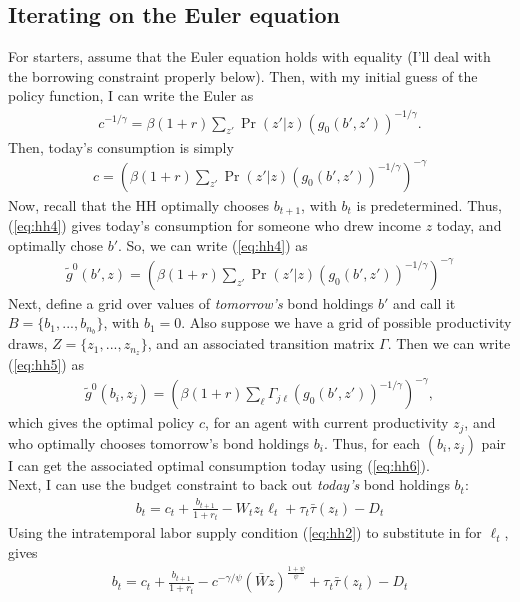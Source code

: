 \documentclass[12pt]{article}
\begin{document}
\subsection{Iterating on the Euler equation}
For starters, assume that the Euler equation holds with equality (I'll deal with the borrowing constraint properly below). Then, with my initial guess of the policy function, I can write the Euler as
\begin{align*}
c^{-1/\gamma} = \beta(1+r) \sum_{z'}\Pr(z'|z)(g_0(b',z'))^{-1/\gamma}.
\end{align*}
Then, today's consumption is simply
\begin{align}
c = \left( \beta(1+r) \sum_{z'}\Pr(z'|z)(g_0(b',z'))^{-1/\gamma}\right)^{-\gamma} \label{eq:hh4}
\end{align}
Now, recall that the HH optimally chooses $b_{t+1}$, with $b_t$ is predetermined. Thus, (\ref{eq:hh4}) gives today's consumption for someone who drew income $z$ today, and optimally chose $b'$. So, we can write (\ref{eq:hh4}) as
\begin{align}
\tilde g^0(b',z) = \left( \beta(1+r) \sum_{z'}\Pr(z'|z)(g_0(b',z'))^{-1/\gamma}\right)^{-\gamma} \label{eq:hh5}
\end{align}
Next, define a grid over values of \textit{tomorrow's} bond holdings $b'$ and call it $B = \{b_1, ...,b_{n_b}\}$, with $b_1 = 0$. Also suppose we have a grid of possible productivity draws, $Z=\{z_1, ..., z_{n_z}\}$, and an associated transition matrix $\Gamma$. Then we can write (\ref{eq:hh5}) as
\begin{align}
\tilde g^0(b_i,z_j) = \left( \beta(1+r) \sum_{\ell}\Gamma_{j\ell} (g_0(b',z'))^{-1/\gamma}\right)^{-\gamma} \label{eq:hh6}, 
\end{align}
which gives the optimal policy $c$, for an agent with current productivity $z_j$, and who optimally chooses tomorrow's bond holdings $b_i$. Thus, for each $(b_i, z_j)$ pair I can get the associated optimal consumption today using (\ref{eq:hh6}).\\

Next, I can use the budget constraint to back out \textit{today's} bond holdings $b_t$:
\begin{align*}
b_t = c_t + \frac{b_{t+1}}{1+r_t} -  W_tz_t\ell_t + \tau_t\bar\tau(z_t) - D_t
\end{align*}
Using the intratemporal labor supply condition (\ref{eq:hh2}) to substitute in for $\ell_t$, gives
\begin{align*}
b_t = c_t + \frac{b_{t+1}}{1+r_t} -  c^{-\gamma/\psi}(\bar Wz)^{\frac{1+\psi}{\psi}} + \tau_t\bar\tau(z_t) - D_t
\end{align*}
\end{document}
